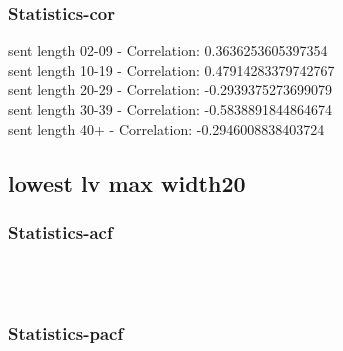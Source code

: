 \documentclass{article}%
\begin{document}
%
\newpage%
\subsubsection{Statistics{-}cor}%
\label{ssubsec:Statistics{-}cor}%
\noindent%
sent length 02-09 - Correlation: 0.3636253605397354\\%
sent length 10-19 - Correlation: 0.47914283379742767\\%
sent length 20-29 - Correlation: -0.2939375273699079\\%
sent length 30-39 - Correlation: -0.5838891844864674\\%
sent length 40+ - Correlation: -0.2946008838403724\\

%
\newpage

%
\subsection{lowest lv max width20}%
\label{subsec:lowestlvmaxwidth20}%
\subsubsection{Statistics{-}acf}%
\label{ssubsec:Statistics{-}acf}%


\begin{figure}[ht]%
\centering%
\setlength{\abovecaptionskip}{-35pt}%
%
%
\\%
%
%
\\%
%
\end{figure}

%
\newpage%
\subsubsection{Statistics{-}pacf}%
\label{ssubsec:Statistics{-}pacf}%
\end{document}

